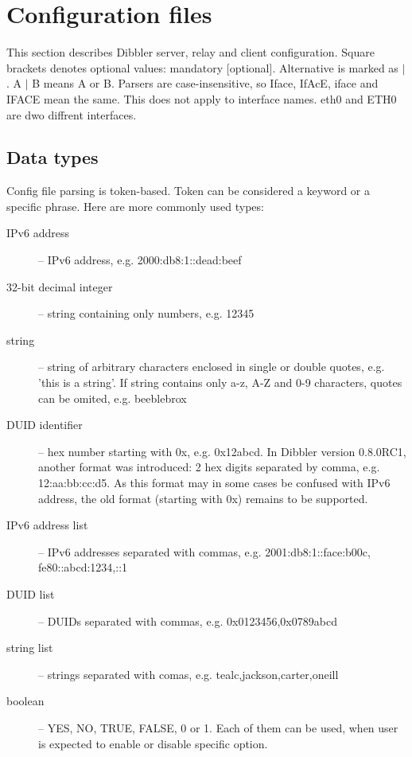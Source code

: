 
\newpage
\section{Configuration files}

This section describes Dibbler server, relay  and client
configuration. Square brackets denotes optional values: mandatory
[optional]. Alternative is marked as $\mid$. A $\mid$ B means A or
B. Parsers are case-insensitive, so Iface, IfAcE, iface and IFACE mean
the same. This does not apply to interface names. eth0 and
ETH0 are dwo diffrent interfaces.

\subsection{Data types}
Config file parsing is token-based. Token can be considered a keyword
or a specific phrase. Here are more commonly used types:
\begin{description}
\item[IPv6 address] -- IPv6 address, e.g. 2000:db8:1::dead:beef
\item[32-bit decimal integer] -- string containing only numbers, e.g. 12345
\item[string] -- string of arbitrary characters enclosed in single or double
  quotes, e.g. 'this is a string'. If string contains only a-z, A-Z and
  0-9 characters, quotes can be omited, e.g. beeblebrox
\item[DUID identifier] -- hex number starting with 0x,
  e.g. 0x12abcd. In Dibbler version 0.8.0RC1, another format was
  introduced: 2 hex digits separated by comma, e.g. 12:aa:bb:cc:d5. As
  this format may in some cases be confused with IPv6 address, the old
  format (starting with 0x) remains to be supported.
\item[IPv6 address list] -- IPv6 addresses separated with commas,
	   e.g. 2001:db8:1::face:b00c, fe80::abcd:1234,::1
\item[DUID list] -- DUIDs separated with commas, e.g. 0x0123456,0x0789abcd
\item[string list] -- strings separated with comas, e.g. tealc,jackson,carter,oneill
\item[boolean] -- YES, NO, TRUE, FALSE, 0 or 1. Each of them can be
  used, when user is expected to enable or disable specific option.
\end{description}

